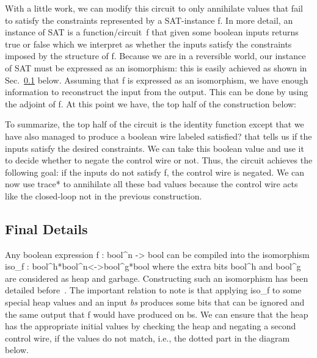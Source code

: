 \documentclass[preprint]{sigplanconf}
\begin{document}
With a little work, we can modify this circuit to only annihilate values that
fail to satisfy the constraints represented by a SAT-instance {{f}}. In more
detail, an instance of SAT is a function/circuit~{{f}} that given some
boolean inputs returns {{true}} or {{false}} which we interpret as whether
the inputs satisfy the constraints imposed by the structure of {{f}}. Because
we are in a reversible world, our instance of SAT must be expressed as an
isomorphism: this is easily achieved as shown in Sec.~\ref{sub:f}
below. Assuming that {{f}} is expressed as an isomorphism, we have enough
information to reconstruct the input from the output. This can be done by
using the adjoint of {{f}}. At this point we have, the top half of the
construction below:

\begin{center}
\end{center}  

To summarize, the top half of the circuit is the identity function except
that we have also managed to produce a boolean wire labeled
\textsf{satisfied?} that tells us if the inputs satisfy the desired
constraints. We can take this boolean value and use it to decide whether to
negate the control wire or not. Thus, the circuit achieves the following
goal: if the inputs do not satisfy {{f}}, the control wire is negated.  We
can now use {{trace*}} to annihilate all these bad values because the control
wire acts like the closed-loop {{not}} in the previous construction.

\subsection{Final Details}
\label{sub:f}

Any boolean expression {{f : bool^n -> bool}} can be compiled into the
isomorphism {{iso_f : bool^h*bool^n<->bool^g*bool}} where the extra bits
{{bool^h}} and {{bool^g}} are considered as heap and garbage. Constructing
such an isomorphism has been detailed
before~\cite{Toffoli:1980,infeffects}. The important relation to note is that
applying {{iso_f}} to some special heap values and an input \textit{bs}
produces some bits that can be ignored and the same output that {{f}} would
have produced on {{bs}}. We can ensure that the heap has the appropriate
initial values by checking the heap and negating a second control wire, if
the values do not match, i.e., the dotted part in the diagram below.
\end{document}
